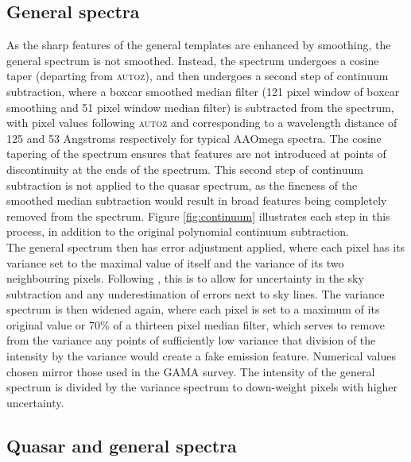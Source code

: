 \documentclass[iop]{emulateapj}
\newcommand{\autoz}{\textsc{autoz}}
\begin{document}
\subsection{General spectra}

As the sharp features of the general templates are enhanced by smoothing, the general spectrum is not smoothed. Instead, the spectrum undergoes a cosine taper (departing from \autoz{}), and then undergoes a second step of continuum subtraction, where a boxcar smoothed median filter (121 pixel window of boxcar smoothing and 51 pixel window median filter) is subtracted from the spectrum, with pixel values following \autoz{} and corresponding to a wavelength distance of 125 and 53 Angstroms respectively for typical AAOmega spectra. The cosine tapering of the spectrum ensures that features are not introduced at points of discontinuity at the ends of the spectrum.  This second step of continuum subtraction is not applied to the quasar spectrum, as the fineness of the smoothed median subtraction would result in broad features being completely removed from the spectrum. Figure \ref{fig:continuum} illustrates each step in this process, in addition to the original polynomial continuum subtraction.\\

The general spectrum then has error adjustment applied, where each pixel has its variance set to the maximal value of itself and the variance of its two neighbouring pixels. Following \citet{baldry2014galaxy}, this is to allow for uncertainty in the sky subtraction and any underestimation of errors next to sky lines. The variance spectrum is then widened again, where each pixel is set to a maximum of its original value or 70\% of a thirteen pixel median filter, which serves to remove from the variance any points of sufficiently low variance that division of the intensity by the variance would create a fake emission feature. Numerical values chosen mirror those used in the GAMA survey. The intensity of the general spectrum is divided by the variance spectrum to down-weight pixels with higher uncertainty. 





\subsection{Quasar and general spectra}
\end{document}
